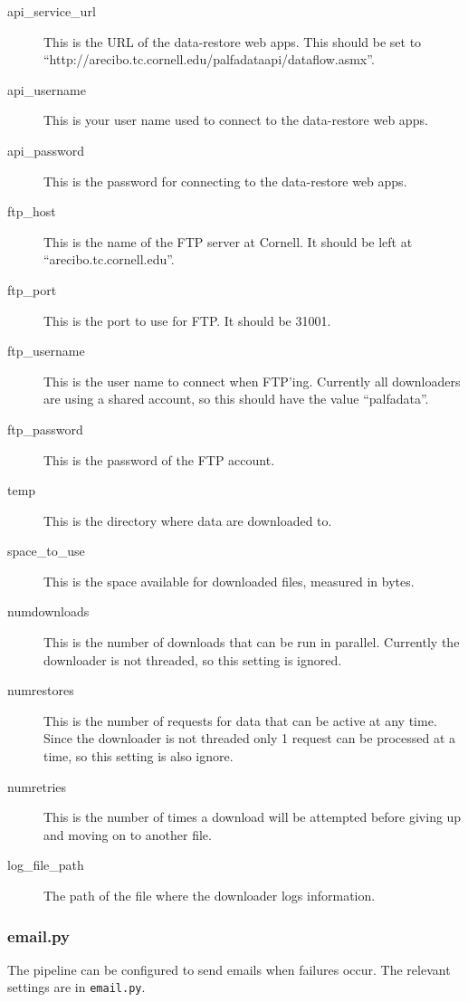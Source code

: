 \begin{description}
    \item[api\_service\_url] This is the URL of the data-restore web apps. This should be set to ``http://arecibo.tc.cornell.edu/palfadataapi/dataflow.asmx''.
    \item[api\_username] This is your user name used to connect to the data-restore web apps.
    \item[api\_password] This is the password for connecting to the data-restore web apps.
    \item[ftp\_host] This is the name of the FTP server at Cornell. It should be left at ``arecibo.tc.cornell.edu''.
    \item[ftp\_port] This is the port to use for FTP. It should be 31001.
    \item[ftp\_username] This is the user name to connect when FTP'ing. Currently all downloaders are using a shared account, so this should have the value ``palfadata''.
    \item[ftp\_password] This is the password of the FTP account.
    \item[temp] This is the directory where data are downloaded to.
    \item[space\_to\_use] This is the space available for downloaded files, measured in bytes.
    \item[numdownloads] This is the number of downloads that can be run in parallel. Currently the downloader is not threaded, so this setting is ignored.
    \item[numrestores] This is the number of requests for data that can be active at any time. Since the downloader is not threaded only 1 request can be processed at a time, so this setting is also ignore.
    \item[numretries] This is the number of times a download will be attempted before giving up and moving on to another file.
    \item[log\_file\_path] The path of the file where the downloader logs information.
\end{description}


\subsubsection{email.py}
The pipeline can be configured to send emails when failures occur. The relevant settings are in \texttt{email.py}.

